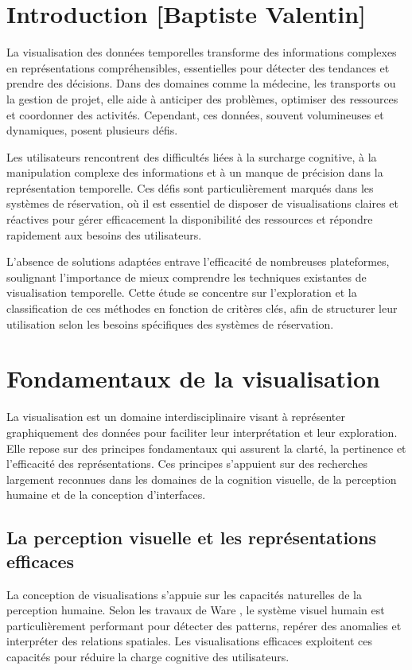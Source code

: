 \documentclass[runningheads]{llncs}
\begin{document}
\section{Introduction [Baptiste Valentin]}
La visualisation des données temporelles transforme des informations complexes en représentations compréhensibles, essentielles pour détecter des tendances et prendre des décisions. Dans des domaines comme la médecine, les transports ou la gestion de projet, elle aide à anticiper des problèmes, optimiser des ressources et coordonner des activités. Cependant, ces données, souvent volumineuses et dynamiques, posent plusieurs défis.

Les utilisateurs rencontrent des difficultés liées à la surcharge cognitive, à la manipulation complexe des informations et à un manque de précision dans la représentation temporelle. Ces défis sont particulièrement marqués dans les systèmes de réservation, où il est essentiel de disposer de visualisations claires et réactives pour gérer efficacement la disponibilité des ressources et répondre rapidement aux besoins des utilisateurs.

L'absence de solutions adaptées entrave l’efficacité de nombreuses plateformes, soulignant l'importance de mieux comprendre les techniques existantes de visualisation temporelle. Cette étude se concentre sur l’exploration et la classification de ces méthodes en fonction de critères clés, afin de structurer leur utilisation selon les besoins spécifiques des systèmes de réservation.

\section{Fondamentaux de la visualisation}

La visualisation est un domaine interdisciplinaire visant à représenter graphiquement des données pour faciliter leur interprétation et leur exploration. Elle repose sur des principes fondamentaux qui assurent la clarté, la pertinence et l'efficacité des représentations. Ces principes s’appuient sur des recherches largement reconnues dans les domaines de la cognition visuelle, de la perception humaine et de la conception d’interfaces.

\subsection{La perception visuelle et les représentations efficaces}
La conception de visualisations s’appuie sur les capacités naturelles de la perception humaine. Selon les travaux de Ware \cite{ware_information_2012}, le système visuel humain est particulièrement performant pour détecter des patterns, repérer des anomalies et interpréter des relations spatiales. Les visualisations efficaces exploitent ces capacités pour réduire la charge cognitive des utilisateurs.
\end{document}
